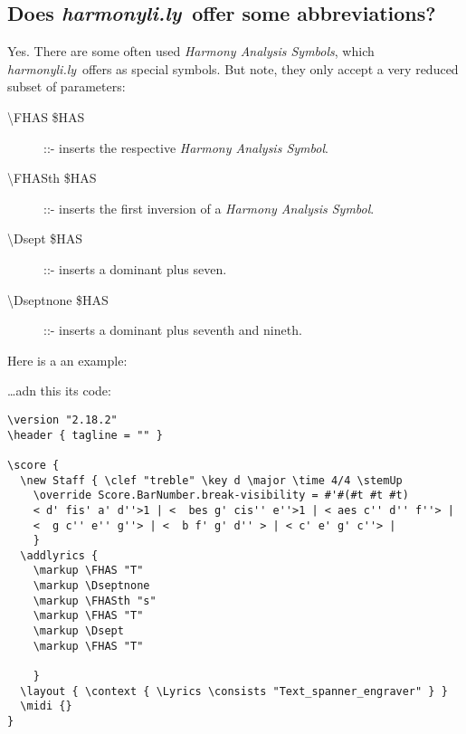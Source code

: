 \documentclass[
  DIV=calc,
  BCOR=5mm,
  12pt,
  headings=small,
  oneside,
  abstract=true,
  toc=bib,
  xcolor=dvipsnames,
  openany,
  english]{scrartcl}
\newcommand{\hlyn}[0]{\textit{harmonyli.ly}}
\newcommand{\has}[1]{\textit{Harmony Analysis Symbol#1}}
\begin{document}
\subsection{Does \hlyn\ offer some abbreviations?}

Yes. There are some often used \has{s}, which \hlyn\ offers as special symbols.
But note, they only accept a very reduced subset of parameters:

\begin{description}
  \item[\textbackslash FHAS \$HAS] ::- inserts the respective \has{}.
  \item[\textbackslash FHASth \$HAS] ::- inserts the first inversion of a \has{}.
  \item[\textbackslash Dsept \$HAS] ::- inserts a dominant plus seven.
  \item[\textbackslash Dseptnone \$HAS] ::- inserts a dominant plus seventh and nineth.
\end{description}

Here is a an example:

\begin{center}
\end{center}

\ldots adn this its code:
\begin{scriptsize}
\begin{verbatim}
\version "2.18.2"
\header { tagline = "" }

\score {
  \new Staff { \clef "treble" \key d \major \time 4/4 \stemUp
    \override Score.BarNumber.break-visibility = #'#(#t #t #t)
    < d' fis' a' d''>1 | <  bes g' cis'' e''>1 | < aes c'' d'' f''> |
    <  g c'' e'' g''> | <  b f' g' d'' > | < c' e' g' c''> |
    }
  \addlyrics {
    \markup \FHAS "T"
    \markup \Dseptnone
    \markup \FHASth "s"
    \markup \FHAS "T"
    \markup \Dsept
    \markup \FHAS "T"

    }
  \layout { \context { \Lyrics \consists "Text_spanner_engraver" } }
  \midi {}
}
\end{verbatim}
\end{scriptsize}
\end{document}
